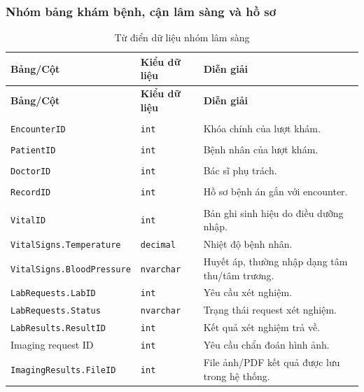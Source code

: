 \documentclass[12pt,a4paper]{article}
\numberwithin{figure}{subsection}
\numberwithin{table}{subsection}
\begin{document}
\subsubsection{Nhóm bảng khám bệnh, cận lâm sàng và hồ sơ}

\begin{longtable}{|p{4.4cm}|p{2.4cm}|p{6.8cm}|}
\caption{Từ điển dữ liệu nhóm lâm sàng} \\
\hline
\textbf{Bảng/Cột} & \textbf{Kiểu dữ liệu} & \textbf{Diễn giải} \\
\hline
\endfirsthead
\hline
\textbf{Bảng/Cột} & \textbf{Kiểu dữ liệu} & \textbf{Diễn giải} \\
\hline
\endhead
\makecell[l]{\texttt{Encounters}\\\texttt{EncounterID}} & \texttt{int} & Khóa chính của lượt khám. \\
\hline
\makecell[l]{\texttt{Encounters}\\\texttt{PatientID}} & \texttt{int} & Bệnh nhân của lượt khám. \\
\hline
\makecell[l]{\texttt{Encounters}\\\texttt{DoctorID}} & \texttt{int} & Bác sĩ phụ trách. \\
\hline
\makecell[l]{\texttt{MedicalRecords}\\\texttt{RecordID}} & \texttt{int} & Hồ sơ bệnh án gắn với encounter. \\
\hline
\makecell[l]{\texttt{VitalSigns}\\\texttt{VitalID}} & \texttt{int} & Bản ghi sinh hiệu do điều dưỡng nhập. \\
\hline
\texttt{VitalSigns.Temperature} & \texttt{decimal} & Nhiệt độ bệnh nhân. \\
\hline
\texttt{VitalSigns.BloodPressure} & \texttt{nvarchar} & Huyết áp, thường nhập dạng tâm thu/tâm trương. \\
\hline
\texttt{LabRequests.LabID} & \texttt{int} & Yêu cầu xét nghiệm. \\
\hline
\texttt{LabRequests.Status} & \texttt{nvarchar} & Trạng thái request xét nghiệm. \\
\hline
\texttt{LabResults.ResultID} & \texttt{int} & Kết quả xét nghiệm trả về. \\
\hline
Imaging request ID & \texttt{int} & Yêu cầu chẩn đoán hình ảnh. \\
\hline
\texttt{ImagingResults.FileID} & \texttt{int} & File ảnh/PDF kết quả được lưu trong hệ thống. \\
\hline
\end{longtable}
\end{document}
